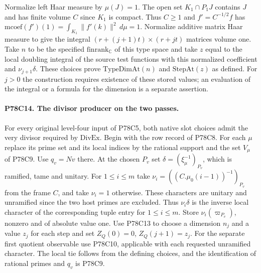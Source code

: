 Normalize left Haar measure by $\mu(J)=1$. The open set
$K_1\cap P_1J$ contains $J$ and has finite volume $C$ since $K_1$
is compact. Thus $C\ge1$ and $f'=C^{-1/2}f$ has
$\mathrm{mcoef}(f')(1)=\int_{K_1}\|f'(k)\|^2\,d\mu=1$.
Normalize additive matrix Haar measure to give the integral
$(r+(j+1)t)\times(r+jt)$ matrices volume one. Take $n$ to be the
specified $\mathrm{finrank}_{\mathbb C}$ of this type space and take
$z$ equal to the local doubling integral of the source test functions
with this normalized coefficient and $\nu_{j+1}\delta$. These choices
prove $\mathrm{TypeDimAt}(n)$ and $\mathrm{StepAt}(z)$ as defined.
For $j>0$ the construction requires existence of these stored values;
an evaluation of the integral or a formula for the dimension is a
separate assertion.

\paragraph{P78C14. The divisor producer on the two passes.}
For every original level-four input of P78C5, both native slot choices
admit the very divisor required by $\mathrm{DivEx}$. Begin with the
row record of P78C8. For each $\mu$ replace its prime set and its local
indices by the rational support and the set $V_\mu$ of P78C9.
Use $q_v=Nv$ there. At the chosen $P_v$ set
$\delta=(\xi_\mu^{-1})_{P_v}$, which is ramified, tame and unitary.
For $1\le i\le m$ take $\nu_i=((C.\mu_0(i-1))^{-1})_{P_v}$
from the frame $C$, and take $\nu_i=1$ otherwise. These characters
are unitary and unramified since the two host primes are excluded.
Thus $\nu_{i}\delta$ is the inverse local character of the
corresponding tuple entry for $1\le i\le m$. Store $\nu_i(\varpi_{P_v})$,
nonzero and of absolute value one. Use P78C13 to choose a dimension $n_j$ and a value $z_j$ for
each step and set $Z_Q(0)=0$, $Z_Q(j+1)=z_j$. For the separate first
quotient observable use P78C10, applicable with each requested
unramified character. The local tie follows from the defining choices,
and the identification of rational primes and $q_v$ is P78C9.


